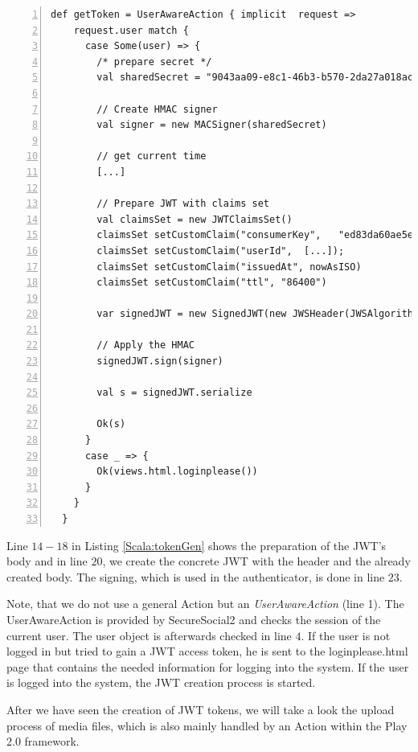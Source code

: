\begin{lstlisting}[numbers=left,caption={Generation of JWT tokens within the backend.},label=Scala:tokenGen,frame=tlbr,breaklines]
def getToken = UserAwareAction { implicit  request =>
    request.user match {
      case Some(user) => {
        /* prepare secret */
        val sharedSecret = "9043aa09-e8c1-46b3-b570-2da27a018ac3" getBytes

        // Create HMAC signer
        val signer = new MACSigner(sharedSecret)

        // get current time
        [...]

        // Prepare JWT with claims set
        val claimsSet = new JWTClaimsSet()
        claimsSet setCustomClaim("consumerKey",   "ed83da60ae5e4d159729eef16a207525")
        claimsSet setCustomClaim("userId",  [...]);
        claimsSet setCustomClaim("issuedAt", nowAsISO)
        claimsSet setCustomClaim("ttl", "86400")

        var signedJWT = new SignedJWT(new JWSHeader(JWSAlgorithm.HS256), claimsSet)

        // Apply the HMAC
        signedJWT.sign(signer)

        val s = signedJWT.serialize

        Ok(s)
      }
      case _ => {
        Ok(views.html.loginplease())
      }
    }
  }
\end{lstlisting}

Line $14-18$ in Listing \ref{Scala:tokenGen} shows the preparation of the JWT's body and in line $20$, we create the concrete JWT with the header and the already created body. The signing, which is used in the authenticator, is done in line $23$. 

Note, that we do not use a general Action but an \emph{UserAwareAction} (line 1).
The UserAwareAction is provided by SecureSocial2 and checks the session of the current user. The user object is afterwards checked in line $4$. If the user is not logged in but tried to gain a JWT access token, he is sent to the loginplease.html page that contains the needed information for logging into the system. If the user is logged into the system, the JWT creation process is started.

After we have seen the creation of JWT tokens, we will take a look the upload process of media files, which is also mainly handled by an Action within the Play 2.0 framework. 

